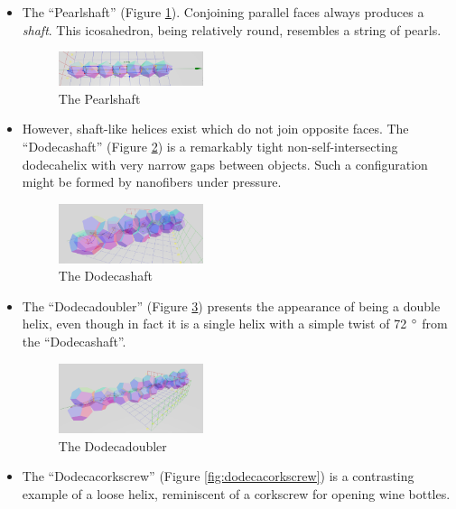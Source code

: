 \documentclass[11pt]{article}
\begin{document}
{\begin{itemize}
\item The ``Pearlshaft'' (Figure \ref{fig:pearlshaft}). Conjoining parallel faces always produces a {\em shaft}. This icosahedron, being relatively round,
  resembles a string of pearls.
\begin{figure}
     \centering
     \includegraphics[width=0.40\textwidth]{figures/PearlShaft.png}
     \caption{The Pearlshaft}
  \label{fig:pearlshaft}
\end{figure}

\item However, shaft-like helices exist which do not join opposite faces. The ``Dodecashaft'' (Figure \ref{fig:dodecashaft}) is a remarkably tight
  non-self-intersecting dodecahelix with very narrow gaps between objects.
  Such a configuration
  might be formed by nanofibers under pressure.
\begin{figure}
     \centering
     \includegraphics[width=0.40\textwidth]{figures/Dodecashaft.png}
     \caption{The Dodecashaft}
  \label{fig:dodecashaft}
\end{figure}
\item The ``Dodecadoubler'' (Figure \ref{fig:dodecadoubler}) presents the appearance of being a double helix, even though in fact it is a single helix with
  a simple twist of 72 $\degree$ from the ``Dodecashaft''.
\begin{figure}
     \centering
     \includegraphics[width=0.40\textwidth]{figures/Dodecadoubler.png}
     \caption{The Dodecadoubler}
  \label{fig:dodecadoubler}
\end{figure}
\item The ``Dodecacorkscrew'' (Figure \ref{fig:dodecacorkscrew}) is a contrasting example of a loose helix, reminiscent of a corkscrew for opening wine bottles.
\begin{figure}

\end{figure}
\end{itemize}}
\end{document}
